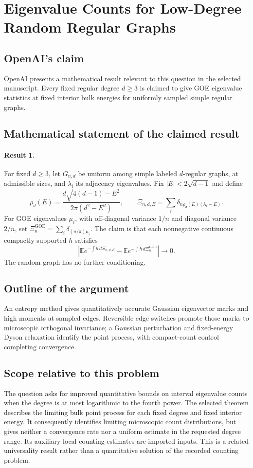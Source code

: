 \documentclass[11pt]{article}
\begin{document}
\section*{Eigenvalue Counts for Low-Degree Random Regular Graphs}

\subsection{OpenAI's claim}
OpenAI presents a mathematical result relevant to this question in the selected manuscript. Every fixed regular degree $d\geq3$ is claimed to give GOE eigenvalue statistics at fixed interior bulk energies for uniformly sampled simple regular graphs.

\subsection{Mathematical statement of the claimed result}
\paragraph{Result 1.} For fixed \(d\ge3\), let \(G_{n,d}\) be uniform among simple labeled \(d\)-regular graphs, at admissible sizes, and \(\lambda_i\) its adjacency eigenvalues. Fix \(|E|<2\sqrt{d-1}\) and define
\[
 \rho_d(E)=\frac{d\sqrt{4(d-1)-E^2}}{2\pi(d^2-E^2)},\qquad
 \Xi_{n,d,E}=\sum_i\delta_{n\rho_d(E)(\lambda_i-E)}.
\]
For GOE eigenvalues \(\mu_i\), with off-diagonal variance \(1/n\) and diagonal variance \(2/n\), set \(\Xi_n^{\mathrm{GOE}}=\sum_i\delta_{(n/\pi)\mu_i}\). The claim is that each nonnegative continuous compactly supported \(h\) satisfies
\[
 \left|\mathbb E e^{-\int h\,d\Xi_{n,d,E}}
 -\mathbb E e^{-\int h\,d\Xi_n^{\mathrm{GOE}}}\right|\to0.
\]
The random graph has no further conditioning.

\subsection{Outline of the argument}
An entropy method gives quantitatively accurate Gaussian eigenvector marks and high moments at sampled edges. Reversible edge switches promote those marks to microscopic orthogonal invariance; a Gaussian perturbation and fixed-energy Dyson relaxation identify the point process, with compact-count control completing convergence.

\subsection{Scope relative to this problem}
The question asks for improved quantitative bounds on interval eigenvalue counts when the degree is at most logarithmic to the fourth power. The selected theorem describes the limiting bulk point process for each fixed degree and fixed interior energy. It consequently identifies limiting microscopic count distributions, but gives neither a convergence rate nor a uniform estimate in the requested degree range. Its auxiliary local counting estimates are imported inputs. This is a related universality result rather than a quantitative solution of the recorded counting problem.
\end{document}
